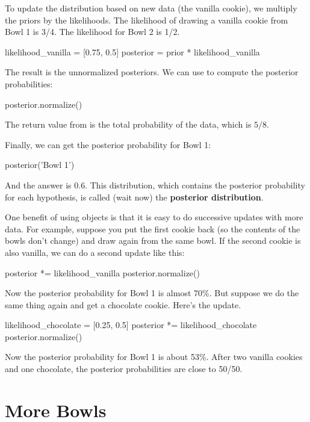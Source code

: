 \documentclass[12pt]{book}
\theoremstyle{exercise}
\begin{document}
To update the distribution based on new data (the vanilla cookie),
we multiply the priors by the likelihoods.  The likelihood
of drawing a vanilla cookie from Bowl 1 is 3/4.  The likelihood
for Bowl 2 is 1/2.

\begin{code}
likelihood_vanilla = [0.75, 0.5]
posterior = prior * likelihood_vanilla
\end{code}

The result is the unnormalized posteriors.
We can use  to compute the posterior probabilities:

\begin{code}
posterior.normalize()
\end{code}

The return value from  is the total probability of the data, which is $5/8$.

Finally, we can get the posterior probability for Bowl 1:

\begin{code}
posterior('Bowl 1')
\end{code}

And the answer is 0.6.
This distribution, which contains the posterior probability for each hypothesis, is called (wait now) the {\bf posterior distribution}.

One benefit of using  objects is that it is easy to do successive updates with more data.  
For example, suppose you put the first cookie back (so the contents of the bowls don't change) and draw again from the same bowl.
If the second cookie is also vanilla, we can do a second update like this:

\begin{code}
posterior *= likelihood_vanilla
posterior.normalize()
\end{code}

Now the posterior probability for Bowl 1 is almost 70\%.
But suppose we do the same thing again and get a chocolate cookie.
Here's the update.

\begin{code}
likelihood_chocolate = [0.25, 0.5]
posterior *= likelihood_chocolate
posterior.normalize()
\end{code}

Now the posterior probability for Bowl 1 is about 53\%.
After two vanilla cookies and one chocolate, the posterior probabilities are close to 50/50.


\section{More Bowls}
\label{morebowls}
\end{document}
